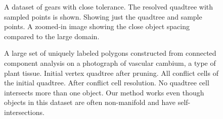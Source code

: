 \documentclass[final,3p,times,twocolumn]{elsarticle}
\begin{document}
\begin{figure}
  \centering
  \caption{
    \protect{} A dataset of gears with close tolerance. The resolved quadtree with sampled points is shown.
    \protect{} Showing just the quadtree and sample points.
    \protect{} A zoomed-in image showing the close object spacing compared to the large domain.
  }
  \label{fig:gears}
\end{figure}

\begin{figure}[t]
  \centering
  \subfloat[][]{
    \label{fig:vascular-3}
    \texttt{[image: Nathan/vascular-bundles/14-Resolved-Quadtree.PNG]} }
  \caption{A large set of uniquely labeled polygons constructed from connected component analysis on a photograph of vascular cambium, a type of plant tissue.
    \protect{} Initial vertex quadtree after pruning.
    \protect{} All conflict cells of the initial quadtree.
    \protect{} After conflict cell resolution. No quadtree cell intersects more than one object. Our method works even though objects in this dataset are often non-manifold and have self-intersections.
  }
  \label{fig:vascular}
\end{figure}


\end{document}
